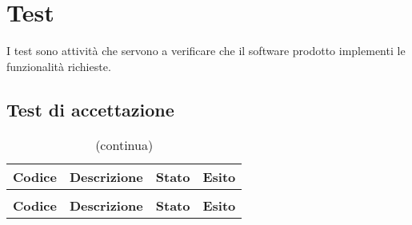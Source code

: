 \section{Test}
I test sono attività che servono a verificare che il software prodotto implementi le funzionalità richieste.
\subsection{Test di accettazione} 
	\renewcommand{\arraystretch}{1.5}
	
	\begin{longtable}{ >{\centering}p{} >{}p{}
			>{\centering}p{} >{\centering}p{}}
			
		\caption{Riepilogo Test di Accettazione}\\	
		\rowcolorhead
		\textbf{\color{white}Codice} 
		& \centering\textbf{\color{white}Descrizione} 
		& \centering\textbf{\color{white}Stato}
		& \centering\textbf{\color{white}Esito} 
		\tabularnewline %
		\endfirsthead	
		
		\rowcolor{white}\caption[]{(continua)}\\	
		\rowcolorhead
		\textbf{\color{white}Codice} 
		& \centering\textbf{\centering\color{white}Descrizione} 
		& \centering\textbf{\color{white}Stato}
		& \centering\textbf{\color{white}Esito} 
		\tabularnewline %
		\endhead	
		

\end{longtable}

